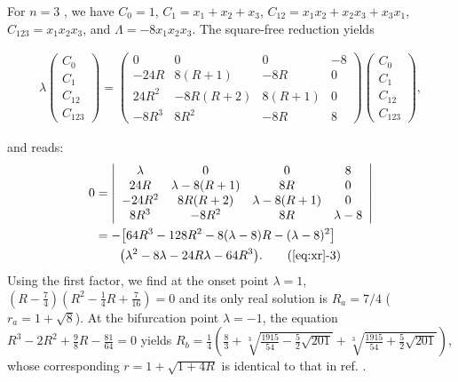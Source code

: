 \documentclass[twocolumn]{revtex4-1}
\begin{document}
For $n = 3$ \cite{brown1, saha, bechhoefer, gordon, burm, zhang},
we have
$C_0 = 1$,
$C_1 = x_1 + x_2 + x_3$,
$C_{12} = x_1 x_2 + x_2 x_3 + x_3 x_1$,
$C_{123} = x_1 x_2 x_3$,
and
$\Lambda = -8 x_1 x_2 x_3$.
%
The square-free reduction yields
%
%
%
\begin{footnotesize}
\begin{align*}
\lambda
\left( \begin{array}{c}
  C_0 \\
  C_1 \\
  C_{12} \\
  C_{123}
\end{array} \right)
=
\left( \begin{array}{cccc}
 0            & 0                 & 0               & -8 \\
 -24 R        & 8(R+1)            & -8R             & 0 \\
 24 R^2       & -8R(R+2)          & 8(R+1)          & 0 \\
 -8R^3        & 8R^2              & -8R             & 8
  \end{array} \right)
\left( \begin{array}{c}
  C_0 \\
  C_1 \\
  C_{12} \\
  C_{123}
\end{array} \right),
\end{align*}
\end{footnotesize}
%
%
%
and  reads:
%
\begin{align}
  0
&=\left| \begin{array}{cccc}
 \lambda      & 0                 & 0               & 8 \\
 24 R         & \lambda - 8(R+1)  & 8R              & 0 \\
 -24 R^2      & 8R(R+2)           & \lambda-8(R+1)  & 0 \\
 8R^3         & -8R^2             & 8R              & \lambda-8
  \end{array} \right| \nonumber \\
&= -\big[
  64R^3 - 128 R^2 - 8 (\lambda - 8) R - (\lambda -8)^2
  \big] \notag \\
&\qquad
  \big(
  \lambda^2 - 8\lambda - 24 R\lambda - 64 R^3
  \big).
  \tag{\ref{eq:xr}-3}
\label{eq:xr3}
\end{align}
%
Using the first factor, we find at the onset point
  $\lambda = 1$,
  $\left(
  R-\frac74
  \right)
  \left(
  R^2-\frac14 R + \frac{7}{16}
  \right)=0$
  and its only real solution is $R_a = 7/4$ ($r_a = 1+\sqrt 8$).
%
At the bifurcation point $\lambda = -1$,
  the equation $R^3-2R^2 + \frac{9}{8} R -\frac{81}{64}=0$
  yields
  $R_b = \frac14
      \left(
      \frac{8}{3} +
        \sqrt[3]{\frac{1915}{54} - \frac52\sqrt{201}}
       +\sqrt[3]{\frac{1915}{54} + \frac52\sqrt{201}}
      \right)$,
whose corresponding $r = 1+\sqrt{1+4R}$
is identical to that in ref. \cite{gordon, burm}.
%
\end{document}
